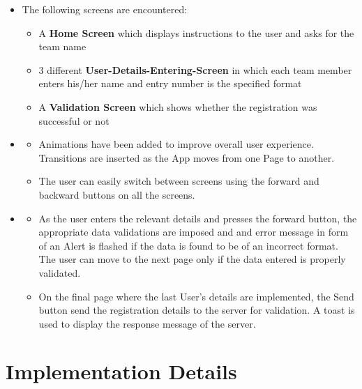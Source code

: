 \documentclass[12pt]{article}
\begin{document}
\begin{itemize}
\item The following screens are encountered:
    \begin{itemize}
        \item A \textbf{Home Screen} which displays instructions to the user and asks for the team name
        \item 3 different \textbf{User-Details-Entering-Screen} in which each team member enters his/her name and entry number is the specified format
        \item A \textbf{Validation Screen} which shows whether the registration was successful or not
    \end{itemize}
    
\newpage
\item \begin{itemize}
    \item Animations have been added to improve overall user experience. Transitions are inserted as the App moves from one Page to another.
    \item The user can easily switch between screens using the forward and backward buttons on all the screens. 
    
    \end{itemize}
\item 
\begin{itemize}
    \item As the user enters the relevant details and presses the forward button, the appropriate data validations are imposed and and error message in form of an Alert is flashed if the data is found to be of an incorrect format. The user can move to the next page only if the data entered is properly validated. 
\item On the final page where the last User's details are implemented, the Send button send the registration details to the server for validation. A toast is used to display the response message of the server.
\end{itemize}
\end{itemize}

\section{Implementation Details~\cite{developer_android}~\cite{stack_overflow}}
\end{document}
